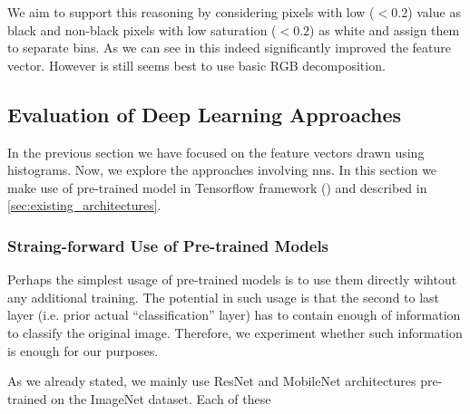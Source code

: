 We aim to support this reasoning by considering pixels with low ($< 0.2$)
value as black and non-black pixels with low saturation ($< 0.2$) as white and
assign them to separate bins. As we can see in  this indeed
significantly improved the feature vector. However is still seems best to
use basic RGB decomposition.

\subsection{Evaluation of Deep Learning Approaches}

In the previous section we have focused on the feature vectors drawn using
histograms. Now, we explore the approaches involving \glspl{nn}. In this
section we make use of pre-trained model in Tensorflow framework
(\cite{tensorflow}) and described in \autoref{sec:existing_architectures}.

\subsubsection{Straing-forward Use of Pre-trained Models}

Perhaps the simplest usage of pre-trained models is to use them directly
wihtout any additional training. The potential in such usage is that the
second to last layer (i.e. prior actual ``classification'' layer) has to
contain enough of information to classify the original image. Therefore,
we experiment whether such information is enough for our purposes.

As we already stated, we mainly use ResNet and MobileNet architectures
pre-trained on the ImageNet dataset. Each of these 